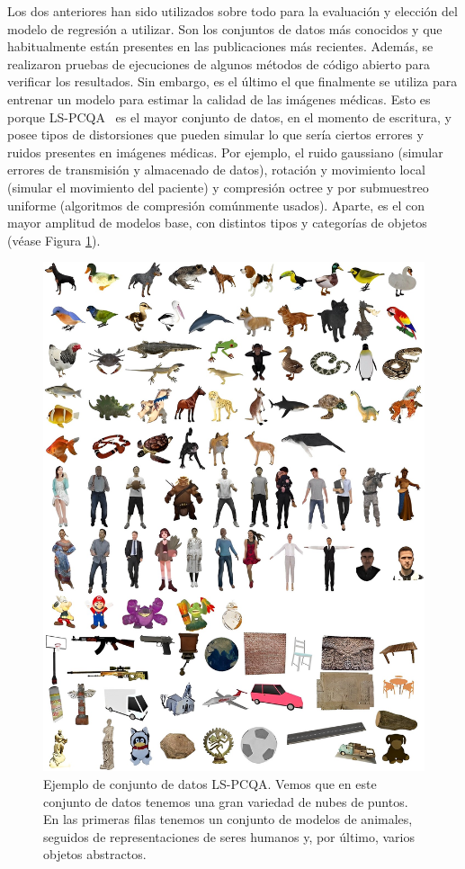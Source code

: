 Los dos anteriores han sido utilizados sobre todo para la evaluación y elección 
del modelo de regresión a utilizar. Son los conjuntos de datos más conocidos 
y que habitualmente están presentes en las publicaciones más recientes. Además, se realizaron 
pruebas de ejecuciones de algunos métodos de código abierto para verificar los 
resultados. Sin embargo, es el último el que finalmente se utiliza para entrenar un modelo para estimar 
la calidad de las imágenes médicas. Esto es porque LS-PCQA~\cite{ResSCNN} 
es el mayor conjunto de datos, en el momento de escritura, y posee tipos de distorsiones que pueden simular 
lo que sería ciertos errores y ruidos presentes en imágenes médicas. Por ejemplo, 
el ruido gaussiano (simular errores de transmisión y almacenado de datos), 
rotación y movimiento local (simular el movimiento del paciente) y compresión 
octree y por submuestreo uniforme (algoritmos de compresión comúnmente usados).
Aparte, es el con mayor amplitud de modelos base, con distintos tipos y categorías 
de objetos (véase Figura \ref{fig:LS-PCQA}).

\begin{figure}[htp]
  \begin{center}
    \includegraphics[width=\textwidth]{imagenes/chapter4/LSPCQA}
  \end{center}
  \caption[Ejemplo de conjunto de datos LS-PCQA.]{Ejemplo de conjunto de datos LS-PCQA.
  Vemos que en este conjunto de datos tenemos una gran variedad de nubes 
de puntos. 
En las primeras filas tenemos un conjunto de modelos de animales, 
seguidos de representaciones de seres humanos y, por último, 
varios objetos abstractos.}
  \label{fig:LS-PCQA}
\end{figure}

